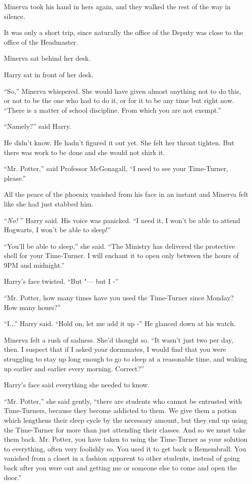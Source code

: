 Minerva took his hand in hers again, and they walked the rest of the way
in silence.

It was only a short trip, since naturally the office of the Deputy was
close to the office of the Headmaster.

Minerva sat behind her desk.

Harry sat in front of her desk.

``So,'' Minerva whispered. She would have given almost anything not to
do this, or not to be the one who had to do it, or for it to be any time
but right now. ``There is a matter of school discipline. From which you
are not exempt.''

``Namely?'' said Harry.

He didn't know. He hadn't figured it out yet. She felt her throat
tighten. But there was work to be done and she would not shirk it.

``Mr. Potter,'' said Professor McGonagall, ``I need to see your
Time-Turner, please.''

All the peace of the phoenix vanished from his face in an instant and
Minerva felt like she had just stabbed him.

``\emph{No!} '' Harry said. His voice was panicked. ``I need it, I won't
be able to attend Hogwarts, I won't be able to sleep!''

``You'll be able to sleep,'' she said. ``The Ministry has delivered the
protective shell for your Time-Turner. I will enchant it to open only
between the hours of 9PM and midnight.''

Harry's face twisted. ``But "--- but I -''

``Mr. Potter, how many times have you used the Time-Turner since Monday?
How many hours?''

``I...'' Harry said. ``Hold on, let me add it up -'' He glanced
down at his watch.

Minerva felt a rush of sadness. She'd thought so. ``It wasn't just two
per day, then. I suspect that if I asked your dormmates, I would find
that you were struggling to stay up long enough to go to sleep at a
reasonable time, and waking up earlier and earlier every morning.
Correct?''

Harry's face said everything she needed to know.

``Mr. Potter,'' she said gently, ``there are students who cannot be
entrusted with Time-Turners, because they become addicted to them. We
give them a potion which lengthens their sleep cycle by the necessary
amount, but they end up using the Time-Turner for more than just
attending their classes. And so we must take them back. Mr. Potter, you
have taken to using the Time-Turner as your solution to everything,
often very foolishly so. You used it to get back a Remembrall. You
vanished from a closet in a fashion apparent to other students, instead
of going back after you were out and getting me or someone else to come
and open the door.''


